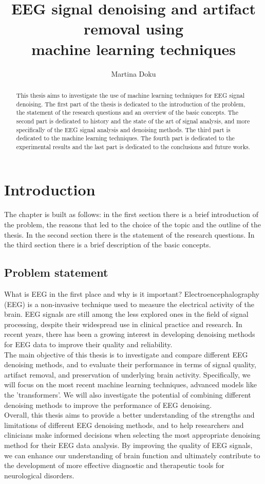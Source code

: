 \documentclass[a4paper]{sapthesis}
\title{EEG signal denoising and artifact removal using \\ machine learning techniques}
\author{Martina Doku}
\begin{document}
\maketitle
\dedication{dedication}
\begin{abstract}
This thesis aims to investigate the use of machine learning
 techniques for EEG signal denoising. The first part of the
thesis is dedicated to the introduction of the problem, the statement
of the research questions and an overview of the basic concepts.
The second part is dedicated to history and 
the state of
the art of signal analysis, and more specifically of the EEG signal
analysis and denoising methods. The third part is dedicated to the
 machine learning techniques.
The fourth part is dedicated to the experimental results and the last part
is dedicated to the conclusions and future works.
\end{abstract}
\tableofcontents
\chapter{Introduction}
The chapter is built as follows: in the first section there is a brief
introduction of the problem, the reasons that led to the choice of the
topic and the outline of the thesis. In the second section there is the
statement of the research questions. In the third section there is a brief
description of the basic concepts.
\section{Problem statement}
What is EEG in the first place and why is it important? Electroencephalography 
(EEG) is a non-invasive technique used to measure the electrical activity of
the brain. EEG signals are still among the less explored ones in the
field of signal processing, despite their widespread use in clinical 
practice and research. In recent years, there has been a growing 
interest in developing denoising methods for EEG data to improve their 
quality and reliability.\newline \\
The main objective of this thesis is to investigate and compare different
 EEG denoising methods, and to evaluate their performance in terms of 
 signal quality, artifact removal, and preservation of underlying brain
activity. Specifically, we will focus on the most recent machine learning
techniques, advanced models like the 'transformers'. We will also investigate the 
potential of combining different denoising methods to improve the 
performance of EEG denoising.\newline \\
Overall, this thesis aims to provide a better understanding of the strengths
 and limitations of different EEG denoising methods, and to help researchers
  and clinicians make informed decisions when selecting the most appropriate
   denoising method for their EEG data analysis. By improving the quality of
    EEG signals, we can enhance our understanding of brain function and 
    ultimately contribute to the development of more effective diagnostic 
    and therapeutic tools for neurological disorders.
\end{document}
